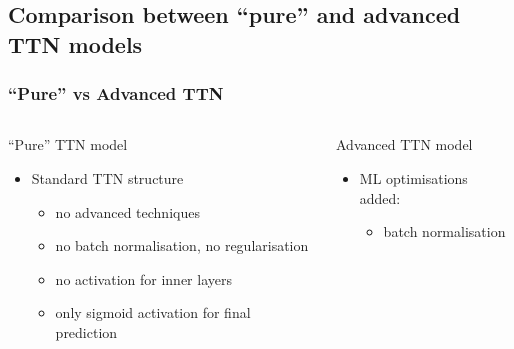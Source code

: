 \documentclass[xcolor=table,8pt]{beamer}
\begin{document}
    \subsection{Comparison between ``pure'' and advanced TTN models}
    \begin{frame}[t]
        \frametitle{``Pure'' vs Advanced TTN}

        \vspace{-0.6cm}
        \begin{columns}
            \begin{column}[t]{0.475\textwidth}
                \begin{center}
                    \begin{block}{``Pure'' TTN model}
                        \begin{itemize}
                            \item Standard TTN structure
                            \begin{itemize}
                                \item no advanced techniques
                                \item no batch normalisation, no regularisation
                                \item no activation for inner layers
                                \item only sigmoid activation for final prediction
                            \end{itemize}
                        \end{itemize}
                    \end{block}
                \end{center}
            \end{column}%
            \begin{column}[t]{0.475\textwidth}
                \begin{center}
                    \begin{block}{Advanced TTN model}
                        \begin{itemize}
                            \item ML optimisations added:
                            \begin{itemize}
                                \item batch normalisation

\end{itemize}
\end{itemize}
\end{block}
\end{center}
\end{column}
\end{columns}
\end{frame}
\end{document}
